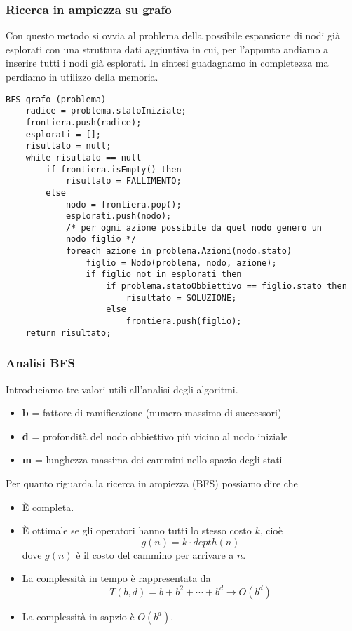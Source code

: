 \subsubsection{Ricerca in ampiezza su grafo}
Con questo metodo si ovvia al problema della possibile espansione di nodi gi\`a esplorati
con una struttura dati aggiuntiva in cui, per l'appunto andiamo a inserire tutti i nodi
gi\`a esplorati. In sintesi guadagnamo in completezza ma perdiamo in utilizzo della memoria.
\begin{lstlisting}[style=pseudo-style]
BFS_grafo (problema)
	radice = problema.statoIniziale;
	frontiera.push(radice);
	esplorati = [];
	risultato = null;
	while risultato == null
		if frontiera.isEmpty() then
			risultato = FALLIMENTO;
		else
			nodo = frontiera.pop();
			esplorati.push(nodo);
			/* per ogni azione possibile da quel nodo genero un 
			nodo figlio */
			foreach azione in problema.Azioni(nodo.stato)
				figlio = Nodo(problema, nodo, azione);
				if figlio not in esplorati then
					if problema.statoObbiettivo == figlio.stato then
						risultato = SOLUZIONE;
					else
						frontiera.push(figlio);
	return risultato;
\end{lstlisting}

\subsubsection{Analisi BFS}
Introduciamo tre valori utili all'analisi degli algoritmi.
\begin{itemize}
	\item \textbf b = fattore di ramificazione (numero massimo di successori)
	\item \textbf d = profondit\`a del nodo obbiettivo pi\`u vicino al nodo iniziale
	\item \textbf m = lunghezza massima dei cammini nello spazio degli stati
\end{itemize}
Per quanto riguarda la ricerca in ampiezza (BFS) possiamo dire che
\begin{itemize}
	\item \`E completa.
	\item \`E ottimale se gli operatori hanno tutti lo stesso costo $k$, cio\`e
	      \[ g(n) = k \cdot depth(n) \]
	      dove $g(n)$ \`e il costo del cammino per arrivare a $n$.
	\item La complessit\`a in tempo \`e rappresentata da
	      \[ T(b, d) = b + b^2 + \cdots + b^d \rightarrow O(b^d) \]
	\item La complessit\`a in sapzio \`e $O(b^d)$.
\end{itemize}

